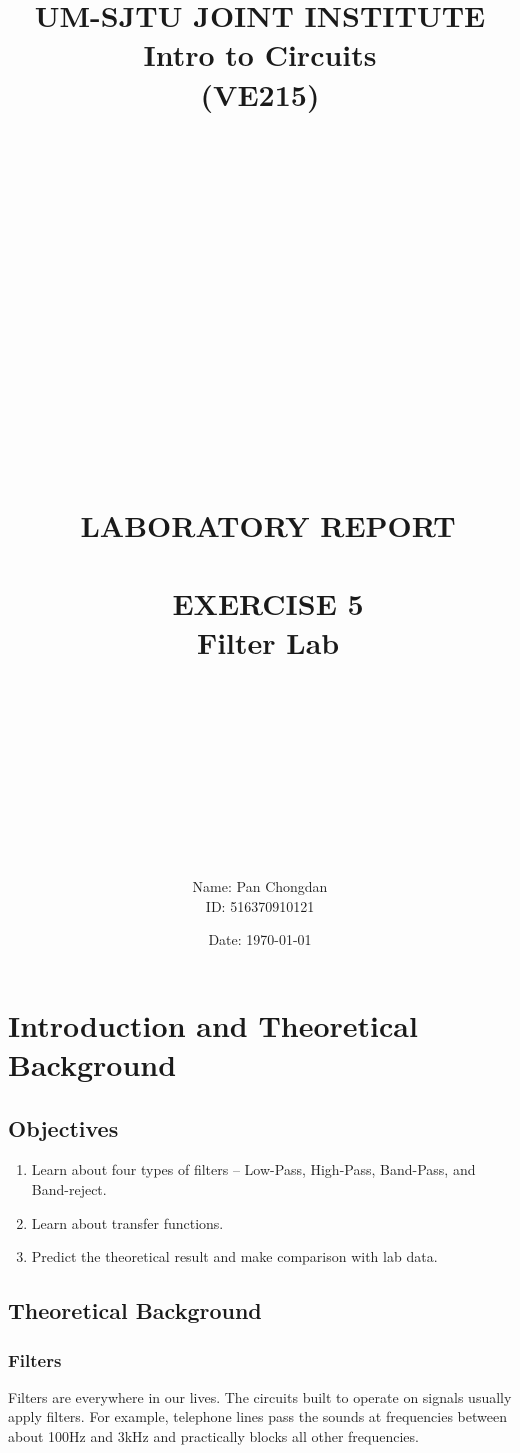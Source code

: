 \documentclass[12pt]{article}
\title{\large UM-SJTU JOINT INSTITUTE\\Intro to Circuits\\(VE215)\\\ \\\ \\\ \\\ \\\ \\\ \\\ \\\ \\\ \\\ \\\
LABORATORY REPORT\\\ \\\ EXERCISE 5\\\ Filter Lab \\\ \\\ \\\ \\\ \\\ }
\author{Name: Pan Chongdan\\ID: 516370910121}
\date{Date: \today}
\begin{document}
\maketitle
\newpage
\section{Introduction and Theoretical Background}
\subsection{Objectives}
\begin{enumerate}
\item Learn about four types of filters – Low-Pass, High-Pass, Band-Pass, and Band-reject.
\item Learn about transfer functions.
\item Predict the theoretical result and make comparison with lab data.
\end{enumerate}
\subsection{Theoretical Background}
\subsubsection{Filters}
Filters are everywhere in our lives. The circuits built to operate on signals usually apply filters. For example, telephone lines pass the sounds at frequencies between about 100Hz and 3kHz and practically blocks all other frequencies.
\end{document}
